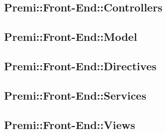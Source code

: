 \subsection{Premi::Front-End::Controllers}

\newpage

\subsection{Premi::Front-End::Model}

\newpage

\subsection{Premi::Front-End::Directives}

\newpage

\subsection{Premi::Front-End::Services}

\newpage

\subsection{Premi::Front-End::Views}

\newpage
